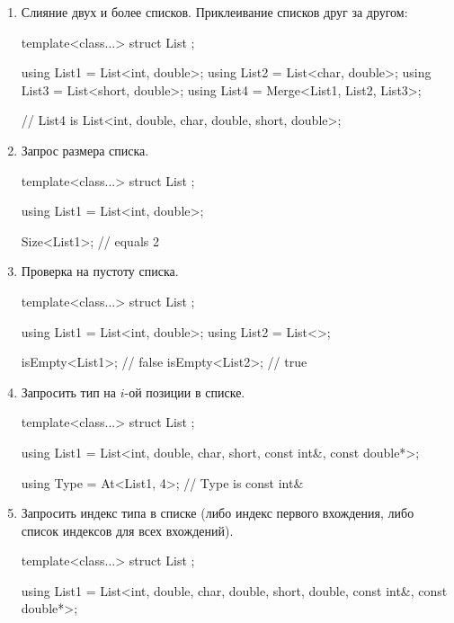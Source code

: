 \begin{enumerate}
\begin{cppcode}
using List1 = List<int, double, char>;

using List2 = PopFront<List1>;
// List2 is List<double, char>
using List3 = PopFront<List1, 2>;
// List3 is List<char>
using List4 = PopBack<List1, 2>;
// List4 is List<int>;
using List5 = PopBack<List1, 4>;
// List5 is List<>;
\end{cppcode}

\item Слияние двух и более списков.
Приклеивание списков друг за другом:
\begin{cppcode}
template<class...>
struct List {};

using List1 = List<int, double>;
using List2 = List<char, double>;
using List3 = List<short, double>;
using List4 = Merge<List1, List2, List3>;

// List4 is List<int, double, char, double, short, double>;
\end{cppcode}

\item Запрос размера списка.
\begin{cppcode}
template<class...>
struct List {};

using List1 = List<int, double>;

Size<List1>; // equals 2
\end{cppcode}

\item Проверка на пустоту списка.
\begin{cppcode}
template<class...>
struct List {};

using List1 = List<int, double>;
using List2 = List<>;

isEmpty<List1>; // false
isEmpty<List2>; // true
\end{cppcode}

\item Запросить тип на $i$-ой позиции в списке.
\begin{cppcode}
template<class...>
struct List {};

using List1 = List<int, double, char, short, const int&, const double*>;

using Type = At<List1, 4>;
// Type is const int&
\end{cppcode}

\item Запросить индекс типа в списке (либо индекс первого вхождения, либо список индексов для всех вхождений).
\begin{cppcode}
template<class...>
struct List {};

using List1 = List<int, double, char, double, short, double, const int&, const double*>;


\end{cppcode}
\end{enumerate}

